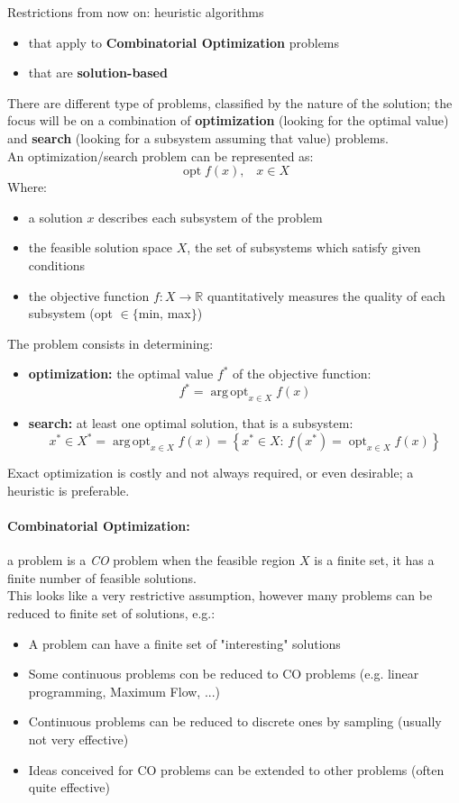 \documentclass[11pt]{article}
\DeclareMathOperator*{\argopt}{arg\,opt}
\DeclareMathOperator*{\opt}{opt}
\begin{document}
	Restrictions from now on: heuristic algorithms 
	\begin{itemize}
		\item that apply to \textbf{Combinatorial Optimization} problems
		\item that are \textbf{solution-based}
	\end{itemize}
	There are different type of problems, classified by the nature of the solution; the focus will be on a combination of \textbf{optimization} (looking for the optimal value) and \textbf{search} (looking for a subsystem assuming that value) problems.\\
	An optimization/search problem can be represented as: 
	$$ \opt f(x), \;\;\; x \in X $$
	Where: 
	\begin{itemize}
		\item a solution $x$ describes each subsystem of the problem
		\item the feasible solution space $X$, the set of subsystems which satisfy given conditions
		\item the objective function $f: X \rightarrow \mathbb{R}$ quantitatively measures the quality of each subsystem (opt $\in \{$min, max$\}$)
	\end{itemize}
	
	\newpage
	
	The problem consists in determining:
	\begin{itemize}
		\item \textbf{optimization:} the optimal value $f^\ast$ of the objective function: 
		$$ f^\ast = \argopt_{x \in X} f(x) $$
		\item \textbf{search:} at least one optimal solution, that is a subsystem: 
		$$ x^\ast \in X^\ast = \argopt_{x \in X} f(x) = \left\{x^\ast \in X: \, f\left(x^\ast\right) = \opt_{x \in X} f(x) \right\}$$
	\end{itemize}
	Exact optimization is costly and not always required, or even desirable; a heuristic is preferable. \\
	
	\paragraph{Combinatorial Optimization:} a problem is a \textit{CO} problem when the feasible region $X$ is a finite set, it has a finite number of feasible solutions. \\
	
	This looks like a very restrictive assumption, however many problems can be reduced to finite set of solutions, e.g.: 
	\begin{itemize}
		\item A problem can have a finite set of "interesting" solutions
		\item Some continuous problems con be reduced to CO problems (e.g. linear programming, Maximum Flow, ...)
		\item Continuous problems can be reduced to discrete ones by sampling (usually not very effective)
		\item Ideas conceived for CO problems can be extended to other problems (often quite effective)
	\end{itemize}
	
\end{document}
